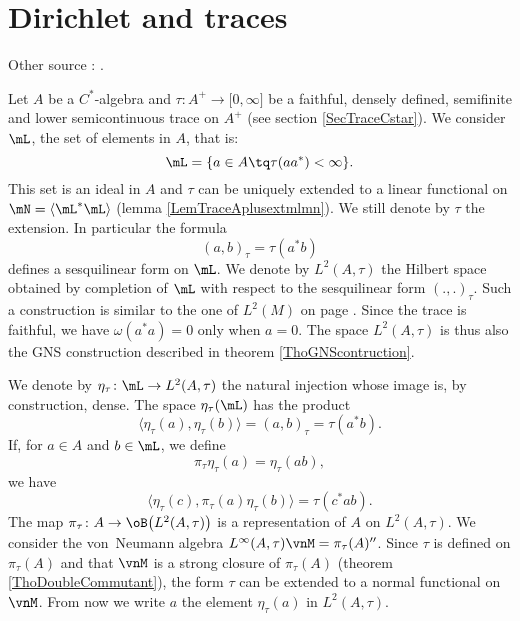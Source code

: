 \section{Dirichlet and traces}

Other source : \cite{TrioloSemifinite,CiprianiStandardForms,CiprianiSauvageotSquareRoots}.

Let $A$ be a $C^*$-algebra and $\tau\colon A^+\to \mathopen[ 0 , \infty \mathclose]$ be a faithful, densely defined, semifinite and lower semicontinuous trace on $A^+$ (see section \ref{SecTraceCstar}). We consider \(\mL\), the set of  elements in \(A\), that is:
\begin{equation}
	\mL=\{ a\in A\tq \tau(aa^*)<\infty \}.
\end{equation}
This set is an ideal in $A$ and $\tau$ can be uniquely extended to a linear functional on $\mN=\langle \mL^*\mL\rangle$ (lemma \ref{LemTraceAplusextmlmn}). We still denote by $\tau$ the extension. In particular the formula
\begin{equation}
	(a,b)_{\tau}=\tau(a^*b)
\end{equation}
defines a sesquilinear form on $\mL$. We denote by $L^2(A,\tau)$ the Hilbert space obtained by completion of $\mL$ with respect to the sesquilinear form $(.,.)_{\tau}$. Such a construction is similar to the one of $L^2(M)$ on page \pageref{PgLdM}. Since the trace is faithful, we have \(\omega(a^*a)=0\) only when \(a=0\). The space \(L^2(A,\tau)\) is thus also the GNS construction described in theorem \ref{ThoGNScontruction}.

We denote by $\eta_{\tau}\colon \mL\to L^2(A,\tau)$ the natural injection whose image is, by construction, dense. The space $\eta_{\tau}(\mL)$ has the product
\begin{equation}
	\langle \eta_{\tau}(a), \eta_{\tau}(b)\rangle =(a,b)_{\tau}=\tau(a^*b).
\end{equation}
If, for $a\in A$ and $b\in\mL$, we define
\begin{equation}
	\pi_{\tau}\eta_{\tau}(a)=\eta_{\tau}(ab),
\end{equation}
we have
\begin{equation}
	\langle \eta_{\tau}(c), \pi_{\tau}(a)\eta_{\tau}(b)\rangle =\tau(c^*ab).
\end{equation}
The map $\pi_{\tau}\colon A\to \oB\big(L^2(A,\tau)\big)$ is a representation of $A$ on $L^2(A,\tau)$. We consider the von~Neumann algebra $L^{\infty}(A,\tau)\vnM=\pi_{\tau}(A)''$. Since $\tau$ is defined on $\pi_{\tau}(A)$ and that $\vnM$ is a strong closure of $\pi_{\tau}(A)$ (theorem \ref{ThoDoubleCommutant}), the form $\tau$ can be extended to a normal functional on $\vnM$. From now we write $a$ the element $\eta_{\tau}(a)$ in $L^2(A,\tau)$.

